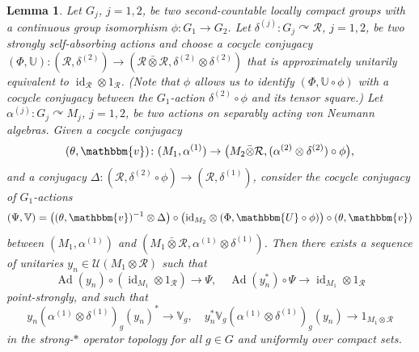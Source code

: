 \documentclass[11pt,a4paper]{article}
\newtheorem{lemma}[theorem]{Lemma}
\theoremstyle{definition}
\theoremstyle{remark}
\numberwithin{equation}{section}
\numberwithin{theorem}{section}
\begin{document}
\begin{lemma} \label{lem:special-cc}
Let $G_j$, $j=1,2$, be two second-countable locally compact groups with a continuous group isomorphism $\phi: G_1\to G_2$.
Let $\delta^{(j)}\colon G_j\curvearrowright\mathcal R$, $j=1,2$, be two strongly self-absorbing actions and choose a cocycle conjugacy $(\Phi,\mathbb{U})\colon (\mathcal R,\delta^{(2)})\to (\mathcal R\bar{\otimes}\mathcal R,\delta^{(2)}\otimes\delta^{(2)})$ that is approximately unitarily equivalent to $\operatorname{id}_{\mathcal R}\otimes 1_{\mathcal R}$.
(Note that $\phi$ allows us to identify $(\Phi,\mathbb{U}\circ\phi)$ with a cocycle conjugacy between the $G_1$-action $\delta^{(2)}\circ\phi$ and its tensor square.)
%
Let $\alpha^{(j)}\colon  G_j\curvearrowright M_j$, $j=1,2$, be two actions on separably acting von Neumann algebras.
Given a cocycle conjugacy
\[
(\theta,\mathbbm{v})\colon (M_1,\alpha^{(1)})\to \big( M_2\bar{\otimes}\mathcal{R}, (\alpha^{(2)}\otimes\delta^{(2)})\circ\phi \big),
\]
and a conjugacy $\Delta\colon (\mathcal R, \delta^{(2)} \circ \phi)\to(\mathcal R,\delta^{(1)})$,
consider the cocycle conjugacy of $G_1$-actions
\[
(\Psi,\mathbb{V})= \big( (\theta, \mathbbm{v})^{-1} \otimes \Delta \big) \circ \big( \mathrm{id}_{M_2} \otimes (\Phi, \mathbbm{U}\circ\phi) \big) \circ (\theta, \mathbbm{v})
\]
between $(M_1,\alpha^{(1)})$ and $(M_1\bar{\otimes}\mathcal R,\alpha^{(1)}\otimes \delta^{(1)} )$.
Then there exists a sequence of unitaries $y_n\in\mathcal{U}(M_1\otimes\mathcal R)$ such that
\[
\operatorname{Ad}(y_n)\circ (\operatorname{id}_{M_1}\otimes 1_{\mathcal R})\to \Psi,\quad \operatorname{Ad}(y_n^*)\circ\Psi \to \operatorname{id}_{M_1}\otimes 1_{\mathcal R}
\]
point-strongly, and such that
\[
y_n(\alpha^{(1)}\otimes\delta^{(1)})_g(y_n)^* \to \mathbb{V}_g,\quad y_n^*\mathbb{V}_g(\alpha^{(1)}\otimes\delta^{(1)})_g(y_n)\to 1_{M_1\otimes\mathcal R}
\]
in the strong-$*$ operator topology for all $g\in G$ and uniformly over compact sets.
\end{lemma}
\end{document}
